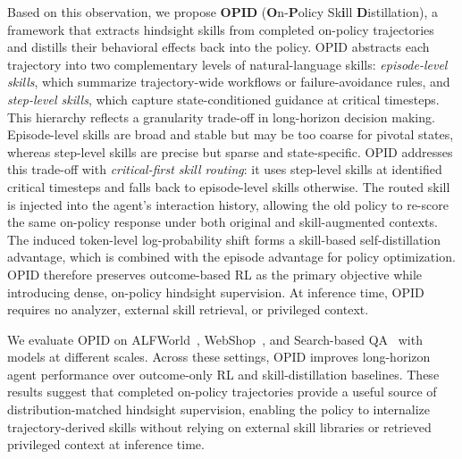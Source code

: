 Based on this observation, we propose \textbf{OPID} (\textbf{O}n-\textbf{P}olicy Sk\textbf{i}ll \textbf{D}istillation), a framework that extracts hindsight skills from completed on-policy trajectories and distills their behavioral effects back into the policy. OPID abstracts each trajectory into two complementary levels of natural-language skills: \emph{episode-level skills}, which summarize trajectory-wide workflows or failure-avoidance rules, and \emph{step-level skills}, which capture state-conditioned guidance at critical timesteps. This hierarchy reflects a granularity trade-off in long-horizon decision making. Episode-level skills are broad and stable but may be too coarse for pivotal states, whereas step-level skills are precise but sparse and state-specific. OPID addresses this trade-off with \emph{critical-first skill routing}: it uses step-level skills at identified critical timesteps and falls back to episode-level skills otherwise. The routed skill is injected into the agent's interaction history, allowing the old policy to re-score the same on-policy response under both original and skill-augmented contexts. The induced token-level log-probability shift forms a skill-based self-distillation advantage, which is combined with the episode advantage for policy optimization. OPID therefore preserves outcome-based RL as the primary objective while introducing dense, on-policy hindsight supervision. At inference time, OPID requires no analyzer, external skill retrieval, or privileged context.

We evaluate OPID on ALFWorld~\citep{shridhar2020alfworld}, 
WebShop~\citep{yao2022webshop}, and Search-based QA~\citep{jin2025searchr1} with models at different scales. Across these settings, OPID improves long-horizon agent performance over outcome-only RL and skill-distillation baselines. These results suggest that completed on-policy trajectories provide a useful source of distribution-matched hindsight supervision, enabling the policy to internalize trajectory-derived skills without relying on external skill libraries or retrieved privileged context at inference time.

